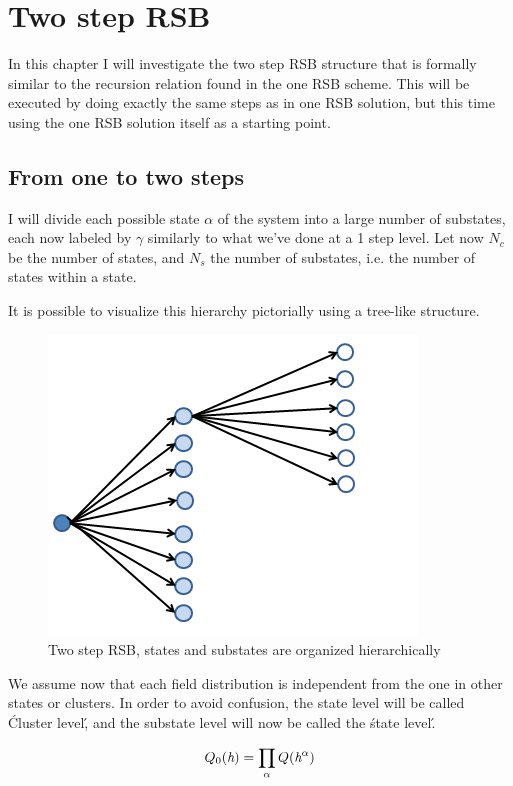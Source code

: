 \chapter{Two step RSB}

In this chapter I will investigate the two step RSB structure that is formally similar to the recursion relation found in the one RSB scheme. This will be executed by doing exactly the same steps as in one RSB solution, but this time using the one RSB solution itself as a starting point.

\section{From one to two steps}

I will divide each possible state $\alpha$ of the system into a large number of substates, each now labeled by $\gamma$ similarly to what we've done at a 1 step level. Let now $N_c$ be the number of states, and $N_s$ the number of substates, i.e. the number of states within a state.

It is possible to visualize this hierarchy pictorially using a tree-like structure.

\begin{figure}[t]
\centering
\includegraphics{img/twostep.png}
\caption{Two step RSB, states and substates are organized hierarchically}
\label{fig:2rsb}
\end{figure}

We assume now that each field distribution is independent from the one in other states or clusters.
In order to avoid confusion, the state level will be called \'Cluster level\', and the substate level will now be called
the \'state level\'.

\begin{equation}
Q_0(\emph{h})=\prod_\alpha Q(\emph{h}^\alpha)
\end{equation}


